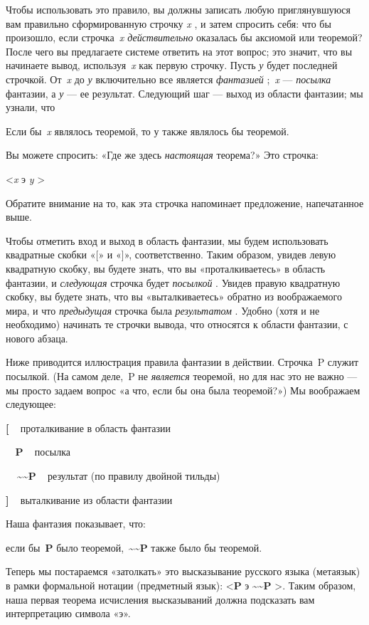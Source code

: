Чтобы использовать это правило, вы должны записать любую приглянувшуюся вам правильно сформированную строчку \emph{x} , и затем спросить себя: что бы произошло, если строчка~\emph{x действительно} оказалась бы аксиомой или теоремой? После чего вы предлагаете системе ответить на этот вопрос; это значит, что вы начинаете вывод, используя~\emph{x} как первую строчку. Пусть \emph{у} будет последней строчкой. От~\emph{x} до \emph{у} включительно все является \emph{фантазией} ;~\emph{x} --- \emph{посылка} фантазии, а \emph{у} --- ее результат. Следующий шаг --- выход из области фантазии; мы узнали, что

Если бы~\emph{x} являлось теоремой, то у также являлось бы теоремой.

Вы можете спросить: «Где же здесь \emph{настоящая} теорема?» Это строчка:

\textless{}\emph{x} э \emph{y} \textgreater{}

Обратите внимание на то, как эта строчка напоминает предложение, напечатанное выше.

Чтобы отметить вход и выход в область фантазии, мы будем использовать квадратные скобки «{[}» и «{]}», соответственно. Таким образом, увидев левую квадратную скобку, вы будете знать, что вы «проталкиваетесь» в область фантазии, и \emph{следующая} строчка будет \emph{посылкой} . Увидев правую квадратную скобку, вы будете знать, что вы «выталкиваетесь» обратно из воображаемого мира, и что \emph{предыдущая} строчка была \emph{результатом} . Удобно (хотя и не необходимо) начинать те строчки вывода, что относятся к области фантазии, с нового абзаца.

Ниже приводится иллюстрация правила фантазии в действии. Строчка~P служит посылкой. (На самом деле,~P не \emph{является} теоремой, но для нас это не важно --- мы просто задаем вопрос «а что, если бы она была теоремой?») Мы воображаем следующее:

\textbf{{[}} ~ проталкивание в область фантазии

\textbf{~ P} ~ посылка

\textbf{~~\textasciitilde\textasciitilde P} ~ результат (по правилу двойной тильды)

\textbf{{]}} ~ выталкивание из области фантазии

Наша фантазия показывает, что:

если бы~\textbf{P} было теоремой,~\textbf{\textasciitilde\textasciitilde P} также было бы теоремой.

Теперь мы постараемся «затолкать» это высказывание русского языка (метаязык) в рамки формальной нотации (предметный язык): \textless{}\textbf{P} э \textbf{\textasciitilde\textasciitilde P} \textgreater. Таким образом, наша первая теорема исчисления высказываний должна подсказать вам интерпретацию символа «э».

